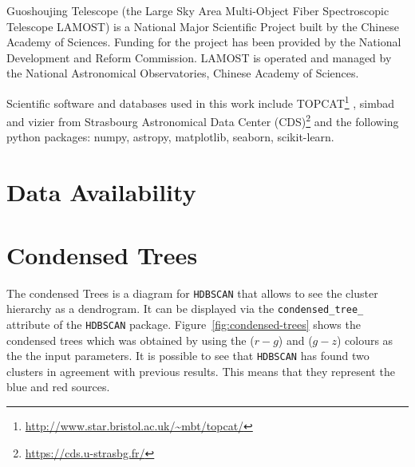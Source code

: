 \documentclass[fleqn,usenatbib]{mnras}
\begin{document}
Guoshoujing Telescope (the Large Sky Area Multi-Object Fiber Spectroscopic
Telescope LAMOST) is a National Major Scientific Project built by the Chinese
Academy of Sciences. Funding for the project has been provided by the National
Development and Reform Commission. LAMOST is operated and managed by the
National Astronomical Observatories, Chinese Academy of Sciences. 

Scientific software
and databases used in this work include 
TOPCAT\footnote{\url{http://www.star.bristol.ac.uk/~mbt/topcat/}} \citep{Taylor:2005}, 
simbad and vizier from Strasbourg Astronomical Data Center (CDS)\footnote{\url{https://cds.u-strasbg.fr/}} 
and the following  python packages: numpy, astropy, matplotlib, seaborn, scikit-learn.

\section*{Data Availability}





 



\clearpage
\appendix
\section{Condensed Trees}
\label{sec:trees}

The condensed Trees is a diagram for \texttt{HDBSCAN} that allows to see the cluster 
hierarchy as a dendrogram.  It can be displayed via the \texttt{condensed\_tree\_}
attribute of the \texttt{HDBSCAN} package. Figure~\ref{fig:condensed-trees} shows
the condensed trees which was obtained by using the ($r - g$) and ($g - z$) colours as the
the input parameters. It is possible to see that \texttt{HDBSCAN} has found
two clusters in agreement with previous results. This means that they represent the blue 
and red sources.  
\end{document}
